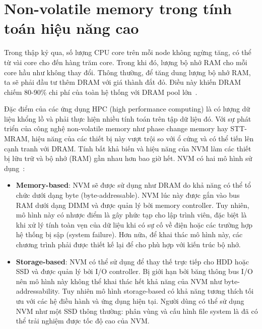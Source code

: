 \clearpage
\section{Non-volatile memory trong tính toán hiệu năng cao}




Trong thập kỷ qua, số lượng CPU core trên mỗi node không ngừng tăng, có thể từ
vài core cho đến hàng trăm core. Trong khi đó, lượng bộ nhớ RAM cho mỗi core hầu
như không thay đổi. Thông thường, để tăng dung lượng bộ nhớ RAM, ta sẽ phải đầu
tư thêm DRAM với giá thành đắt đỏ. Điều này khiến DRAM chiếm 80-90\% chi phí của
toàn hệ thống với DRAM pool lớn~\cite{mironovPerformanceEvaluationIntel2019}.

Đặc điểm của các ứng dụng HPC (high performance computing) là có lượng dữ liệu
khổng lồ và phải thực hiện nhiều tính toán trên tập dữ liệu đó. Với sự phát
triển của công nghệ non-volatile memory như phase change memory hay STT-MRAM,
hiệu năng của các thiết bị này vượt trội so với ổ cứng và có thể tiến lên cạnh
tranh với DRAM. Tính bất khả biến và hiệu năng của NVM làm các thiết bị lữu trữ
và bộ nhớ (RAM) gần nhau hơn bao giờ hết. NVM có hai mô hình sử
dụng~\cite{liuPerformanceEvaluationModeling2017}:

\begin{itemize}
    \item \textbf{Memory-based}: NVM sẽ được sử dụng như DRAM do khả năng có thể
    tổ chức dưới dạng byte (byte-addressable). NVM lúc này được gắn vào bus RAM
    dưới dạng DIMM và được quản lý bởi memory controller. Tuy nhiên, mô hình này
    có nhược điểm là gây phức tạp cho lập trình viên, đặc biệt là khi xử lý tính
    toàn vẹn của dữ liệu khi có sự cố về điện hoặc các trường hợp hệ thống bị
    sập (system failure). Hơn nữa, để khai thác mô hình này, các chương trình
    phải được thiết kế lại để cho phù hợp với kiến trúc bộ nhớ.

    \item \textbf{Storage-based}: NVM có thể sử dụng để thay thế trực tiếp cho
    HDD hoặc SSD và được quản lý bởi I/O controller. Bị giới hạn bởi băng thông
    bus I/O nên mô hình này không thể khai thác hết khả năng của NVM như
    byte-addressability. Tuy nhiên mô hình storage-based có khả năng tương thích
    tối ưu với các hệ điều hành và ứng dụng hiện tại. Người dùng có thể sử dụng
    NVM như một SSD thông thường: phân vùng và cấu hình file system là đã có thể
    trải nghiệm được tốc độ cao của NVM.

\end{itemize}

